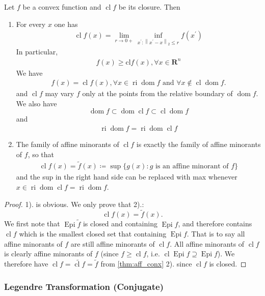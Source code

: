 \documentclass{article}
\newcommand{\cl}{\operatorname{cl}}
\newcommand{\ri}{\operatorname{ri}}
\newcommand{\dom}{\operatorname{dom}}
\newcommand{\Epi}{\operatorname{Epi} }
\begin{document}
\begin{cora}\label{cora:hiuque}
  Let $f$ be a convex function and $\cl f$ be its closure. Then
  \begin{enumerate}[1).]
      \item  For every $x$ one has
\begin{align*}
\cl f(x)=\lim _{r \rightarrow 0+} \inf _{x^{\prime}:\left\|x^{\prime}-x\right\|_{2} \leq r} f\left(x^{\prime}\right)
\end{align*}
In particular,
\begin{align*}
f(x) \geq \mathrm{cl} f(x), \forall x\in \mathbf{R}^n
\end{align*}
We have 
\begin{align*}
f(x)=\cl f(x),  \forall x \in \ri \dom f \text{ and }\forall x \not\in \cl \dom f.
\end{align*}
and $\cl f$ may vary $f$ only at the points from the relative boundary of $\operatorname{dom} f$. We also have
$$\dom  f \subset \dom \cl f \subset \cl \dom  f$$
and 
\begin{align*}
\ri \dom f=\ri \dom \cl  f
\end{align*}
\item The family of affine minorants of $\cl f$ is exactly the family of affine minorants of $f$, so that
\begin{align*}
\cl f(x)= \tilde{f}(x)\coloneqq \sup \{g(x): g \text { is an affine minorant of } f\}
\end{align*}
and the sup in the right hand side can be replaced with max whenever $x \in\ri \dom \cl f=\ri \dom f$.

  \end{enumerate}
\end{cora}
\begin{proof}\color{ForestGreen}
1). is obvious. We only prove that 2).: $$\cl f(x)= \tilde{f}(x).$$ 
We first note that $\Epi \tilde{f}$ is closed and containing $\Epi f$, and therefore contains $\cl f$ which is the smallest closed set that containing $\Epi f$. That is to say all affine minorants of $f$ are still affine  minorants of $\cl f$. All affine  minorants of $\cl f$ is clearly affine minorants of $f$ (since $f\ge \cl f$, i.e. $\cl \Epi f\supseteq \Epi f$). 
We therefore have $\cl f = \widetilde{\cl f}=\tilde{f}$ from \cref{thm:aff_conx} 2). since $\cl f$ is closed.
\end{proof}


\subsubsection{Legendre Transformation (Conjugate)}
\end{document}
